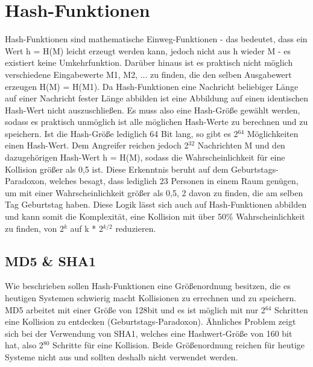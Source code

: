 \documentclass[10pt, a4paper,headsepline]{scrreprt}
\begin{document}
\section{Hash-Funktionen}
Hash-Funktionen sind mathematische Einweg-Funktionen - das bedeutet, dass ein Wert h = H(M) leicht erzeugt werden kann, jedoch nicht aus h wieder M - es existiert keine Umkehrfunktion. Darüber hinaus ist es praktisch nicht möglich verschiedene Eingabewerte M1, M2, ... zu finden, die den selben Ausgabewert erzeugen H(M) = H(M1). Da Hash-Funktionen eine Nachricht beliebiger Länge auf einer Nachricht fester Länge abbilden ist eine Abbildung auf einen identischen Hash-Wert nicht auszuschließen. Es muss also eine Hash-Größe gewählt werden, sodass es praktisch unmöglich ist alle möglichen Hash-Werte zu berechnen und zu speichern. Ist die Hash-Größe lediglich 64 Bit lang, so gibt es 2$^{64}$ Möglichkeiten einen Hash-Wert. Dem Angreifer reichen jedoch 2$^{32}$ Nachrichten M und den dazugehörigen Hash-Wert h = H(M), sodass die Wahrscheinlichkeit für eine Kollision größer als 0,5 ist. Diese Erkenntnis beruht auf dem Geburtstags-Paradoxon, welches besagt, dass lediglich 23 Personen in einem Raum genügen, um mit einer Wahrscheinlichkeit größer als 0,5, 2 davon zu finden, die am selben Tag Geburtstag haben. Diese Logik lässt sich auch auf Hash-Funktionen abbilden und kann somit die Komplexität, eine Kollision mit über 50\% Wahrscheinlichkeit zu finden, von 2$^{k}$ auf k * 2$^{k/2}$ reduzieren.

\subsection{MD5 \& SHA1}
Wie beschrieben sollen Hash-Funktionen eine Größenordnung besitzen, die es heutigen Systemen schwierig macht Kollisionen zu errechnen und zu speichern. MD5 arbeitet mit einer Größe von 128bit und es ist möglich mit nur 2$^{64}$ Schritten eine Kollision zu entdecken (Geburtstags-Paradoxon). Ähnliches Problem zeigt sich bei der Verwendung von SHA1, welches eine Hashwert-Größe von 160 bit hat, also 2$^{80}$ Schritte für eine Kollision. Beide Größenordnung reichen für heutige Systeme nicht aus und sollten deshalb nicht verwendet werden.
\end{document}
